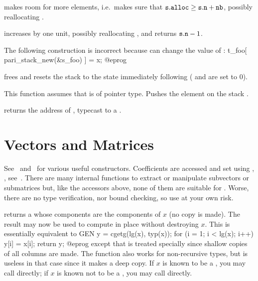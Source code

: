  makes room for  more
elements, i.e.~makes sure that ${\tt s.alloc}\geq{\tt s.n} + {\tt nb}$, possibly
reallocating .

 increases  by one unit,
possibly reallocating , and returns ${\tt s.n}-1$.

 The following construction is incorrect because
 can change the value of :
\bprog
t_foo[ pari_stack_new(&s_foo) ] = x;
@eprog

 frees  and resets the stack
to the state immediately following  ( and
 are set to $0$).

 This function assumes that
 is of pointer type. Pushes the element  on the stack .

 returns the address of ,
typecast to a .

\section{Vectors and Matrices}

See~ and~ for various useful constructors.
Coefficients are accessed and set using , ,
see~. There are many internal functions to extract or
manipulate subvectors or submatrices but, like the accessors above, none of
them are suitable for . Worse, there are no type
verification, nor bound checking, so use at your own risk.

 returns a  whose components are the
components of $x$ (no copy is made). The result may now be used to compute in
place without destroying $x$. This is essentially equivalent to
\bprog
  GEN y = cgetg(lg(x), typ(x));
  for (i = 1; i < lg(x); i++) y[i] = x[i];
  return y;
@eprog\noindent
except that  is treated specially since shallow copies of all columns
are made. The function also works for non-recursive types, but is useless
in that case since it makes a deep copy. If $x$ is known to be a , you
may call  directly; if $x$ is known not to be a ,
you may call  directly.

